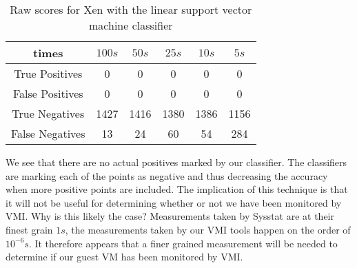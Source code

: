 \begin{table}
\centering
  \begin{tabular}{| c | c | c | c | c | c |}
  \hline
  times & $100s$ & $50s$ & $25s$ & $10s$ & $5s$\\ \hline
  True Positives  & 0 & 0 & 0 & 0 & 0 \\ \hline
  False Positives & 0 & 0 & 0 & 0 & 0 \\ \hline
  True Negatives  & 1427 & 1416 & 1380 & 1386 & 1156 \\ \hline
  False Negatives & 13 & 24 & 60 & 54 & 284  \\ \hline
  \end{tabular}
  \caption{ Raw scores for Xen with the linear support vector machine classifier}
  \label{RawScores}
\end{table}


We see that there are no actual positives marked by our classifier. The classifiers are marking each of the points as negative and thus decreasing the accuracy when more positive points are included. The implication of this technique is that it will not be useful for determining whether or not we have been monitored by VMI. Why is this likely the case? Measurements taken by Sysstat are at their finest grain $1s$, the measurements taken by our VMI tools happen on the order of $10^{-6}s$.  It therefore appears that a finer grained measurement will be needed to determine if our guest VM has been monitored by VMI. 